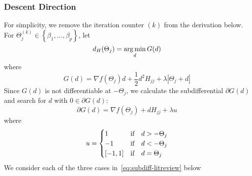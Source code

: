 \subsubsection{Descent Direction}
For simplicity, we remove the iteration counter $(k)$ from the derivation below.\\ For \mbox{$\Theta_j^{(k)} \in \left\lbrace \beta_1, \ldots, \beta_p \right\rbrace$}, let
\begin{equation}
d_{H}(\Theta_{j}) = \operatorname*{arg\,min}_{d} G(d)  \label{eq:argminGd-litreview}
\end{equation}
where
\[ G(d) =  \nabla f(\Theta_{j}) d + \frac{1}{2} d^2 H_{j j} + \lambda |\Theta_{j} + d| \]
Since $G(d)$ is not differentiable at $-\Theta_j$, we calculate the subdifferential $\partial G(d)$ and search for $d$ with $0 \in \partial G(d)$:
\begin{equation}
\partial G(d) = \nabla f(\Theta_{j}) + d H_{j j} + \lambda u   \label{eq:subdiff-litreview}
\end{equation}
where
\begin{equation}
u = \begin{cases}
1 & \textrm{{if\quad}}d > -\Theta_j \\
-1 & \textrm{{if\quad}} d < -\Theta_j\\
[-1,1] & \textrm{{if\quad}} d = \Theta_j
\end{cases}
\end{equation}
We consider each of the three cases in~\eqref{eq:subdiff-litreview} below
